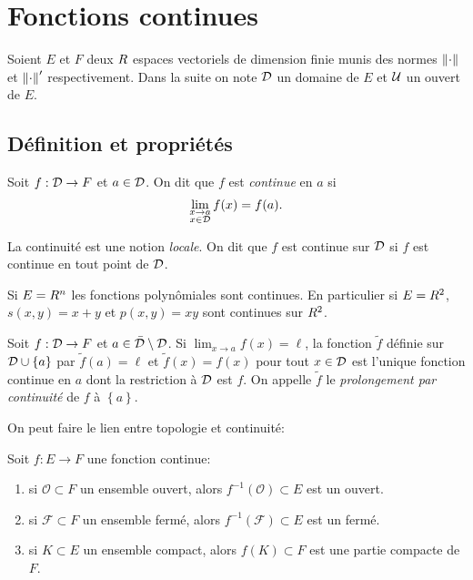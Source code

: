 \sld{\vfill\pagebreak[5]}%
\section{Fonctions continues}

Soient $E$ et $F$ deux $R$ espaces vectoriels de dimension finie munis des normes $\left\lVert\cdot\right\rVert$ et $\left\lVert\cdot\right\rVert'$ respectivement. Dans la suite on note $\mathcal{D}$ un domaine de $E$ et $\mathcal{U}$ un ouvert de $E$.

\subsection{Définition et propriétés}

\begin{definition}
    Soit $f:\mathcal{D}\to F$ et $a\in \mathcal{D}$. On dit que $f$ est \emph{continue} en $a$ si 
    \[
    \lim_{\substack{ x\to a \\ x\in \mathcal{D}}} f(x) = f(a).\]
\end{definition}

La continuité est une notion \emph{locale}. On dit que $f$ est continue sur $\mathcal{D}$ si $f$ est continue en tout point de $\mathcal{D}$.

\begin{exemple}
    Si $E = R^n$ les fonctions polynômiales sont continues. En particulier si $E = R^2$, $s(x,y) = x+y$ et $p(x,y) = xy$ sont continues sur $R^2$.	
\end{exemple}

\sld{\vfill\pagebreak[5]}%
\begin{defprop}
    Soit $f:\mathcal{D}\to F$ et $a\in \bar {\mathcal{D}} \setminus \mathcal{D}$. Si $\lim_{x\to a } f(x) =\ell$, la fonction $\tilde f$ définie sur $\mathcal{D} \cup \left\{ a \right\}$ par $\tilde f(a) = \ell$ et $\tilde f(x) = f(x)$ pour tout $x\in\mathcal{D}$ est l'unique fonction continue en $a$ dont la restriction à $\mathcal{D}$ est $f$. On appelle $\tilde f$ le \emph{prolongement par continuité} de $f$ à $\left\{ a \right\}$. 
\end{defprop}

On peut faire le lien entre topologie et continuité:
\begin{theorem}[]
    Soit $f:E \to F $ une fonction continue:
    \begin{enumerate}[label=$(\roman*)$]
        \item si $\mathcal O \subset F$ un ensemble ouvert, alors $f^{-1}(\mathcal O) \subset E$ est un ouvert. 
        \item si $\mathcal F \subset F$ un ensemble fermé,  alors $f^{-1}(\mathcal F) \subset E$ est un fermé. 
        \item si $K \subset E$ un ensemble compact, alors $f(K) \subset F$ est une partie compacte de $F$. \label{weiertrass}
    \end{enumerate}
\end{theorem}

